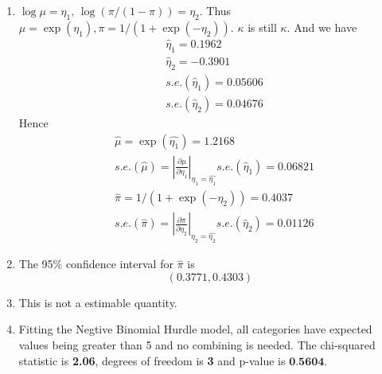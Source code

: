 \documentclass{article}
\begin{document}
\begin{enumerate}[leftmargin = 0 em, label = \arabic*., font = \bfseries]
\begin{enumerate}
		\item 
		$\log \mu = \eta_1,\, \log(\pi /(1 - \pi)) = \eta_2$. Thus $\mu = \exp(\eta_1), \pi = 1/(1 +\exp(-\eta_2))$. $\kappa$ is still $\kappa$. And we have
		  \begin{align*}
		   &\hat{\eta}_1 = 0.1962\\
		   & \hat{\eta}_2 = -0.3901\\
		   &s.e.(\hat{\eta}_1) = 0.05606\\
		   & s.e.(\hat{\eta}_2) = 0.04676
		   \end{align*}
		   Hence 
		   \begin{align*}
		   &\hat{\mu} = \exp(\hat{\eta_1}) = 1.2168\\
		   &s.e.(\hat{\mu}) = \left|\frac{\partial \mu}{\partial \eta_1}\right|_{\eta_1 = \hat{\eta_1}} s.e.(\hat{\eta}_1) = 0.06821\\
		   &\hat{\pi} = 1/(1+\exp(-\eta_2)) = 0.4037 \\
		   &s.e.(\hat{\pi}) = \left|\frac{\partial \pi}{\partial \eta_2}\right|_{\eta_2 = \hat{\eta_2}} s.e.(\hat{\eta}_2) = 0.01126 
		   \end{align*}

		   \item 
		   The 95\% confidence interval for $\hat{\pi}$ is
		   \[(0.3771, 0.4303)\]

		   \item 
		   This is not a estimable quantity.

		   \item 
		   Fitting the Negtive Binomial Hurdle model, all categories have expected values being greater than 5 and no combining is needed. The chi-squared statistic is \textbf{2.06},  degrees of freedom is \textbf{3} and p-value is $ \textbf{0.5604}$.

	\end{enumerate}
	
	
	
	

	
	
	\end{enumerate}





	
	
	
	
\end{document}
